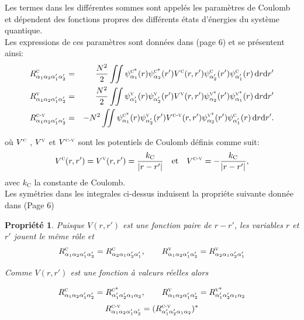 \documentclass[12pt,a4paper,openany,oneside]{book}
\newtheorem{property}{Propriété}[chapter]
\begin{document}
{{Les termes dans les différentes sommes sont appelés les paramètres de Coulomb et dépendent des fonctions propres des diﬀérents états d'énergies du système quantique.\\
 Les expressions de ces paramètres sont données dans \cite{mareference10} (page 6) et se présentent ainsi:
\begin{eqnarray*}
R^{\textsc{c}}_{\alpha_{1}\alpha_{2}\alpha'_{1}\alpha'_{2}} &= &\dfrac{N^{2}}{2}\iint \psi^{\textsc{c*}}_{\alpha_{1}}(r)\psi^{\textsc{c*}}_{\alpha_{2}}(r')V^{\textsc{c}}(r,r')\psi^{\textsc{c}}_{\alpha'_{2}}(r')\psi^{\textsc{c}}_{\alpha'_{1}}(r)\,\mathrm{d}r\mathrm{d}r'\\
R^{\textsc{v}}_{\alpha_{1}\alpha_{2}\alpha'_{1}\alpha'_{2}} &=& \dfrac{N^{2}}{2}\iint \psi^{\textsc{v}}_{\alpha'_{1}}(r)\psi^{\textsc{v}}_{\alpha'_{2}}(r')V^{\textsc{v}}(r,r')\psi^{\textsc{v*}}_{\alpha_{2}}(r')\psi^{\textsc{v*}}_{\alpha_{1}}(r)\,\mathrm{d}r\mathrm{d}r'\\
R^{\textsc{c-v}}_{\alpha_{1}\alpha_{2}\alpha'_{1}\alpha'_{2}} &= &-N^{2}\iint \psi^{\textsc{c*}}_{\alpha_{1}}(r)\psi^{\textsc{v}}_{\alpha'_{2}}(r')V^{\textsc{c-v}}(r,r')\psi^{\textsc{v*}}_{\alpha_{2}}(r')\psi^{\textsc{c}}_{\alpha'_{1}}(r)\,\mathrm{d}r\mathrm{d}r'.
 \end{eqnarray*}

 où $ V^{\textsc{c}}$ , $V^{\textsc{v}}$ et $ V^{\textsc{c-v}}$ sont les potentiels de Coulomb définis comme suit:
 $$ V^{\textsc{c}}(r,r')= V^{\textsc{v}}(r,r')=\dfrac{k_{\textrm{C}}}{\vert r-r'\vert}\quad \mathrm{et}\quad V^{\textsc{c-v}}=-\dfrac{k_{\textrm{C}}}{\vert r-r'\vert},$$
avec $ k_{\textrm{C}}$ la constante de Coulomb.\\

Les symétries dans les integrales ci-dessus induisent la propriéte suivante donnée dans \cite{mareference10} (Page 6)
\begin{property}
Puisque $ V(r,r')$ est une fonction paire de $r-r'$, les variables $r$ et $r'$ jouent le même rôle et
$$ R^{\textsc{c}}_{\alpha_{1}\alpha_{2}\alpha'_{1}\alpha'_{2}} = R^{\textsc{c}}_{\alpha_{2}\alpha_{1}\alpha'_{2}\alpha'_{1}}, \qquad  R^{\textsc{v}}_{\alpha_{1}\alpha_{2}\alpha'_{1}\alpha'_{2}} = R^{\textsc{v}}_{\alpha_{2}\alpha_{1}\alpha'_{2}\alpha'_{1}}$$

Comme $ V(r,r')$ est une fonction à valeurs réelles alors 

$$ R^{\textsc{c}}_{\alpha_{1}\alpha_{2}\alpha'_{1}\alpha'_{2}} = R^{\textsc{c*}}_{\alpha'_{1}\alpha'_{2}\alpha_{1}\alpha_{2}}, \qquad  R^{\textsc{v}}_{\alpha_{1}\alpha_{2}\alpha'_{1}\alpha'_{2}} = R^{\textsc{v*}}_{\alpha'_{1}\alpha'_{2}\alpha_{1}\alpha_{2}}$$
$$ R^{\textsc{c-v}}_{\alpha_{1}\alpha_{2}\alpha'_{1}\alpha'_{2}} = (R^{\textsc{c-v}}_{\alpha'_{1}\alpha'_{2}\alpha_{1}\alpha_{2}})^{*}$$
\end{property}

}}
\end{document}
